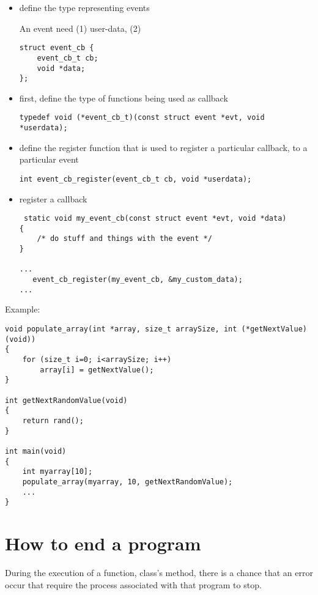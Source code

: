 \begin{itemize}
  \item define the type representing events

An event need (1) user-data, (2)   
\begin{verbatim}
struct event_cb {
    event_cb_t cb;
    void *data;
};
\end{verbatim}

  \item first, define the type of functions being used as callback
\begin{verbatim}
typedef void (*event_cb_t)(const struct event *evt, void *userdata);
\end{verbatim}


  \item define the register function that is used to register a particular
  callback, to a particular event
\begin{verbatim}
int event_cb_register(event_cb_t cb, void *userdata);
\end{verbatim}

   \item register a callback
 
 \begin{verbatim}
 static void my_event_cb(const struct event *evt, void *data)
{
    /* do stuff and things with the event */
}

...
   event_cb_register(my_event_cb, &my_custom_data);
...
 \end{verbatim} 
\end{itemize}

Example:
\begin{verbatim}
void populate_array(int *array, size_t arraySize, int (*getNextValue)(void))
{
    for (size_t i=0; i<arraySize; i++)
        array[i] = getNextValue();
}

int getNextRandomValue(void)
{
    return rand();
}

int main(void)
{
    int myarray[10];
    populate_array(myarray, 10, getNextRandomValue);
    ...
}
\end{verbatim}

\section{How to end a program}
\label{sec:C_end-program}

During the execution of a function, class's method, there is a chance that an
error occur that require the process associated with that program to stop.

